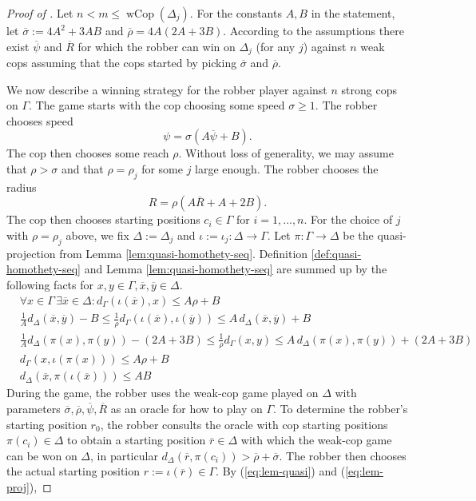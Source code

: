 \documentclass{amsart}
\theoremstyle{definition}
\theoremstyle{remark}
\theoremstyle{remark}
\theoremstyle{definition}
\newcommand{\wCop}{\operatorname{wCop}}
\renewcommand{\leq}{\leqslant}
\renewcommand{\geq}{\geqslant}
\begin{document}
\begin{proof}[Proof of ]


	Let \(n < m \leq \wCop(\Delta_j)\). For the constants $A,B$ in the statement, let $\overline{\sigma} := 4A^2+3AB$ and $\overline{\rho} = 4A(2A+3B)$. According to the assumptions there exist $\overline{\psi}$ and $\overline{R}$ for which the robber can win on $\Delta_j$ (for any $j$) against $n$ weak cops assuming that the cops started by picking $\overline{\sigma}$ and $\overline{\rho}$.

    We now describe a winning strategy for the robber player against $n$ strong cops on $\Gamma$. The game starts with the cop choosing some speed $\sigma \geq 1$. The robber chooses speed
    $$
    \psi = \sigma  \left( A \overline{\psi} + B\right) .
    $$
    The cop then chooses some reach $\rho$. Without loss of generality, we may assume that $\rho > \sigma$ and that $\rho = \rho_j$ for some $j$ large enough. The robber chooses the radius
    $$
    R = \rho (A\overline{R} + A + 2B).
    $$
    The cop then chooses starting positions $c_i \in \Gamma$ for $i = 1 , \ldots , n$. For the choice of $j$ with $\rho = \rho_j$ above, we fix $\Delta := \Delta_j$ and $\iota := \iota_j \colon \Delta \to \Gamma$. Let $\pi  \colon \Gamma \to \Delta$ be the quasi-projection from Lemma \ref{lem:quasi-homothety-seq}. Definition \ref{def:quasi-homothety-seq} and Lemma \ref{lem:quasi-homothety-seq} are summed up by the following facts for $x,y \in \Gamma, \overline{x}, \overline{y} \in \Delta$.
    \setcounter{equation}{0}
    \begin{align}
        &\forall x \in \Gamma \, \exists \overline{x} \in \Delta \colon d_{\Gamma}(\iota(\overline{x}),x) \leq A\rho + B \label{eq:def-surj} \\
    & \frac{1}{A} d_{\Delta}(\overline{x},\overline{y}) - B \leq \frac{1}{\rho}d_{\Gamma}(\iota(\overline{x}),\iota(\overline{y}))  \leq A \, d_{\Delta}(\overline{x},\overline{y}) + B \label{eq:def-quasi} \\
    &\frac{1}{A}  d_{\Delta}(\pi(x),\pi(y))  -  (2A + 3B) \leq \frac{1}{\rho} d_{\Gamma}(x,y)\leq A\,  d_{\Delta}(\pi(x),\pi(y))  +  (2A + 3B) \label{eq:lem-quasi} \\
    &    d_{\Gamma}(x,\iota(\pi(x))) \leq A\rho+ B \label{eq:lem-surj} \\
    & d_{\Delta}(\overline{x}, \pi(\iota(\overline{x})) ) \leq AB \label{eq:lem-proj}
    \end{align}
    During the game, the robber uses the weak-cop game played on $\Delta$ with parameters $\overline{\sigma}, \overline{\rho}, \overline{\psi} , \overline{R}$ as an oracle for how to play on $\Gamma$. To determine the robber's starting position $r_0$, the robber consults the oracle with cop starting positions $\pi(c_i) \in \Delta$ to obtain a starting position $\overline{r} \in \Delta$ with which the weak-cop game can be won on $\Delta$, in particular $d_\Delta(\overline{r}, \pi(c_i)) > \overline{\rho} + \overline{\sigma}$. The robber then chooses the actual starting position $r := \iota(\overline{r}) \in \Gamma$. By (\ref{eq:lem-quasi}) and (\ref{eq:lem-proj}),

\end{proof}
\end{document}
